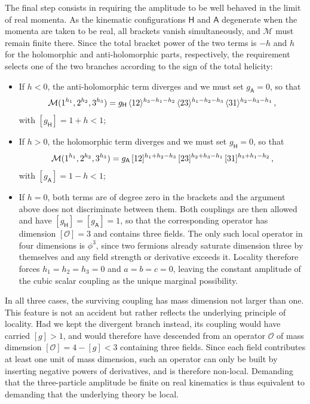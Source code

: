 The final step consists in requiring the amplitude to be well behaved in the limit of real momenta.
As the kinematic configurations $\mathsf H$ and $\mathsf A$ degenerate when the momenta are taken to
be real, all brackets vanish simultaneously, and $\mathcal M$ must remain finite there. Since the
total bracket power of the two terms is $-h$ and $h$
for the holomorphic and anti-holomorphic parts, respectively, the requirement selects one of the two
branches according to the sign of the total helicity:
\begin{itemize}
    \item If $h<0$, the anti-holomorphic term diverges and we must set $g_{\mathsf A}=0$, so that
    \begin{equation}\label{eq:3parthol}
        \mathcal M (1^{h_1},2^{h_2},3^{h_3}) = g_{\mathsf H}\, \langle 1 2 \rangle^{h_3-h_1-h_2}\, \langle 2 3 \rangle^{h_1 - h_2 - h_3}\, \langle 3 1 \rangle^{h_2 - h_3 - h_1}\,,
    \end{equation}
    with $[g_{\mathsf H}] = 1+h<1$;
    \item If $h>0$, the holomorphic term diverges and we must set $g_{\mathsf H}=0$, so that
    \begin{equation}\label{eq:3partahol}
        \mathcal M (1^{h_1},2^{h_2},3^{h_3}) = g_{\mathsf A}\, \lbrack 1 2 \rbrack^{h_1+h_2-h_3}\, \lbrack 2 3 \rbrack^{h_2+h_3-h_1}\, \lbrack 3 1 \rbrack^{h_3+h_1-h_2} \,,
    \end{equation}
    with $[g_{\mathsf A}] = 1-h<1$;
    \item If $h=0$, both terms are of degree zero in the brackets and the argument above does not
    discriminate between them. Both couplings are then allowed and have $[g_{\mathsf H}]=[g_{\mathsf A}]=1$, so that the
    corresponding operator has dimension $[\mathcal O]=3$ and contains three fields. The only such
    local operator in four dimensions is $\phi^3$, since two fermions already saturate dimension
    three by themselves and any field strength or derivative exceeds it. Locality therefore forces
    $h_1=h_2=h_3=0$ and $a=b=c=0$, leaving the constant amplitude of the cubic scalar coupling as
    the unique marginal possibility.
\end{itemize}

In all three cases, the surviving coupling has mass dimension not larger than one. This feature is
not an accident but rather reflects the underlying principle of locality.
Had we kept the divergent branch instead, its coupling
would have carried $[g]>1$, and would therefore have descended from an operator $\mathcal O$ of mass
dimension $[\mathcal O]=4-[g]<3$ containing three fields. Since each
field contributes at
least one unit of mass dimension, such an operator can only be built by inserting negative powers of
derivatives, and is therefore non-local. Demanding that the three-particle amplitude be finite on
real kinematics is thus equivalent to demanding that the underlying theory be local.

